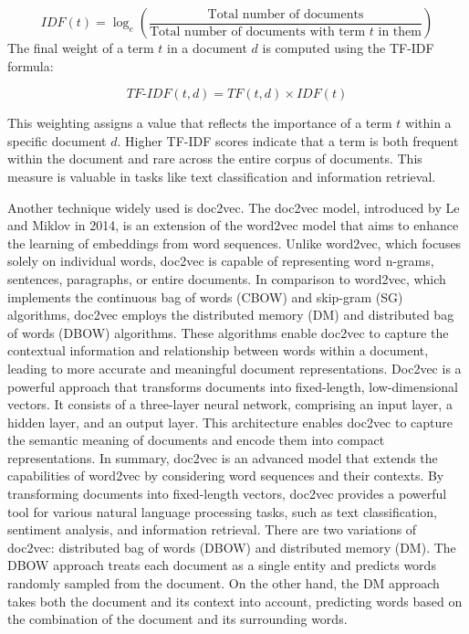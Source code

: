 \documentclass[conference]{IEEEtran}
\begin{document}
\[
IDF(t) = \log_e \left( \frac{\text{Total number of documents}}{\text{Total number of documents with term } t \text{ in them}} \right) \tag{2}
\]
The final weight of a term $t$ in a document $d$ is computed using the TF-IDF formula:

\[
TF\text{-}IDF(t,d) = TF(t,d) \times IDF(t) \tag{3}
\]

This weighting assigns a value that reflects the importance of a term $t$ within a specific document $d$. Higher TF-IDF scores indicate that a term is both frequent within the document and rare across the entire corpus of documents. This measure is valuable in tasks like text classification and information retrieval.

Another technique widely used is doc2vec.
 The doc2vec model, introduced by Le and Miklov in 2014\cite{r12}, is an extension of the word2vec model\cite{r11} that aims to enhance the learning of embeddings from word sequences. Unlike word2vec, which focuses solely on individual words, doc2vec is capable of representing word n-grams, sentences, paragraphs, or entire documents.
 In comparison to word2vec, which implements the continuous bag of words (CBOW)\cite{r13} and skip-gram (SG) algorithms, doc2vec employs the distributed memory (DM) and distributed bag of words (DBOW) algorithms\cite{r14}. These algorithms enable doc2vec to capture the contextual information and relationship between words within a document, leading to more accurate and meaningful document representations. Doc2vec is a powerful approach that transforms documents into fixed-length, low-dimensional vectors. It consists of a three-layer neural network, comprising an input layer, a hidden layer, and an output layer. This architecture enables doc2vec to capture the semantic meaning of documents and encode them into compact representations. In summary, doc2vec is an advanced model that extends the capabilities of word2vec by considering word sequences and their contexts. By transforming documents into fixed-length vectors, doc2vec provides a powerful tool for various natural language processing tasks, such as text classification, sentiment analysis, and information retrieval. There are two variations of doc2vec: distributed bag of words (DBOW)\cite{r15} and distributed memory (DM)\cite{r16}. The DBOW approach treats each document as a single entity and predicts words randomly sampled from the document. On the other hand, the DM approach takes both the document and its context into account, predicting words based on the combination of the document and its surrounding words.
\end{document}
